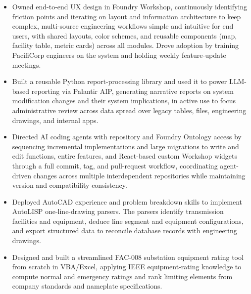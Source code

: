 \documentclass[10pt, letterpaper]{article}
\newenvironment{rlist}{%
  \begin{itemize}[leftmargin=1.4em, itemsep=1pt, topsep=2pt, parsep=0pt]%
}{%
  \end{itemize}%
}
\begin{document}
\begin{rlist}
  \item Owned end-to-end UX design in Foundry Workshop, continuously identifying friction points and iterating on layout and information architecture to keep complex, multi-source engineering workflows simple and intuitive for end users, with shared layouts, color schemes, and reusable components (map, facility table, metric cards) across all modules. Drove adoption by training PacifiCorp engineers on the system and holding weekly feature-update meetings.
  \item Built a reusable Python report-processing library and used it to power LLM-based reporting via Palantir AIP, generating narrative reports on system modification changes and their system implications, in active use to focus administrative review across data spread over legacy tables, files, engineering drawings, and internal apps.
  \item Directed AI coding agents with repository and Foundry Ontology access by sequencing incremental implementations and large migrations to write and edit functions, entire features, and React-based custom Workshop widgets through a full commit, tag, and pull-request workflow, coordinating agent-driven changes across multiple interdependent repositories while maintaining version and compatibility consistency.
  \item Deployed AutoCAD experience and problem breakdown skills to implement AutoLISP one-line-drawing parsers. The parsers identify transmission facilities and equipment, deduce line segment and equipment configurations, and export structured data to reconcile database records with engineering drawings.
  \item Designed and built a streamlined FAC-008 substation equipment rating tool from scratch in VBA/Excel, applying IEEE equipment-rating knowledge to compute normal and emergency ratings and rank limiting elements from company standards and nameplate specifications.
\end{rlist}
\end{document}
